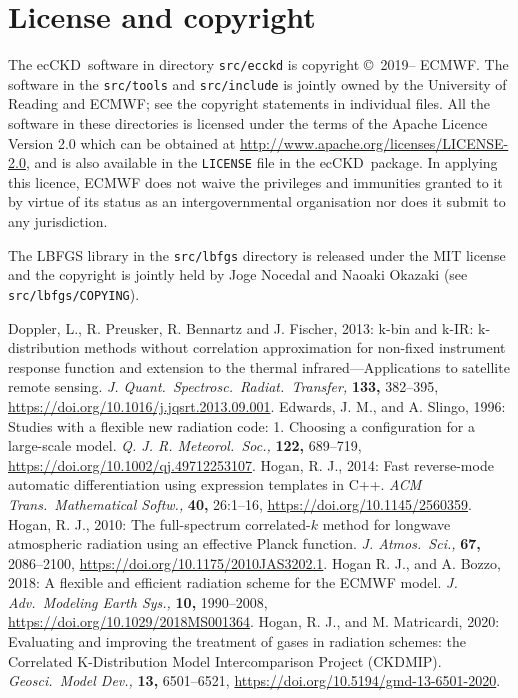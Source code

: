 \documentclass[a4,oneside]{article}
\def\codesize{\small}
\newcommand{\ecckd}{ecCKD}
\def\codesize{\small}
\def\code#1{{\codesize\texttt{#1}}}
\begin{document}
\section{License and copyright}
\label{sec:license}
The \ecckd\ software in directory \code{src/ecckd} is copyright
\copyright\ 2019-- ECMWF. The software in the \code{src/tools} and
\code{src/include} is jointly owned by the University of Reading and
ECMWF; see the copyright statements in individual files. All the
software in these directories is licensed under the terms of the
Apache Licence Version 2.0 which can be obtained at
\url{http://www.apache.org/licenses/LICENSE-2.0}, and is also
available in the \code{LICENSE} file in the \ecckd\ package.  In
applying this licence, ECMWF does not waive the privileges and
immunities granted to it by virtue of its status as an
intergovernmental organisation nor does it submit to any jurisdiction.

The LBFGS library in the \code{src/lbfgs} directory is released under
the MIT license and the copyright is jointly held by Joge Nocedal and
Naoaki Okazaki (see \code{src/lbfgs/COPYING}).

\begin{thebibliography}{00}
%    
Doppler, L.,
  R. Preusker, R. Bennartz and J. Fischer, 2013: {k-bin} and {k-IR}:
  k-distribution methods without correlation approximation for
  non-fixed instrument response function and extension to the thermal
  infrared---Applications to satellite remote
  sensing. \textit{J. Quant.\ Spectrosc.\ Radiat.\ Transfer,}
  \textbf{133,} 382--395,
  \url{https://doi.org/10.1016/j.jqsrt.2013.09.001}.
%
Edwards, J. M., and
  A. Slingo, 1996: Studies with a flexible new radiation code: 1.
  Choosing a configuration for a large-scale
  model. \textit{Q. J. R. Meteorol.\ Soc.,} \textbf{122,} 689--719,
  \url{https://doi.org/10.1002/qj.49712253107}.
%
Hogan, R. J., 2014: Fast
  reverse-mode automatic differentiation using expression templates in
  C++.  \textit{ACM Trans.\ Mathematical Softw.,} \textbf{40,}
  26:1--16, \url{https://doi.org/10.1145/2560359}.
%
Hogan, R. J., 2010: The
  full-spectrum correlated-$k$ method for longwave atmospheric
  radiation using an effective Planck
  function. \textit{J. Atmos.\ Sci.,} \textbf{67,} 2086--2100,
  \url{https://doi.org/10.1175/2010JAS3202.1}.
%
Hogan R. J., and
  A. Bozzo, 2018: A flexible and efficient radiation scheme for the
  ECMWF model. \emph{J. Adv.\ Modeling Earth Sys.,} \textbf{10,}
  1990--2008, \url{https://doi.org/10.1029/2018MS001364}.
%
Hogan, R. J., and
  M. Matricardi, 2020: Evaluating and improving the treatment of gases
  in radiation schemes: the Correlated K-Distribution Model
  Intercomparison Project (CKDMIP). \textit{Geosci.\ Model Dev.,}
  \textbf{13,} {6501--6521,}
  \url{https://doi.org/10.5194/gmd-13-6501-2020}.
%
\end{thebibliography}
\end{document}
